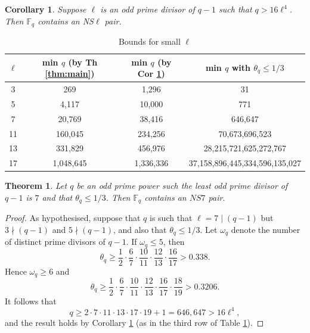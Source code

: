 \documentclass[10pt,a4paper]{amsart}
\newtheorem{thm}{Theorem}
\newtheorem{cor}{Corollary}
\newcommand{\F}{\mathbb{F}_q}
\begin{document}
\begin{cor}\label{Npos}
Suppose $\ell$ is an odd prime divisor of $q-1$ such that $q > 16 \ell^4$. Then $\F$ contains an  NS$\ell$ pair.
\end{cor}

\begin{table}[h]\label{smalltable}
\centering 
\caption{Bounds for small $\ell$}
\begin{tabular}{c|c|c|c}   
$\ell$ 
& min $q$ (by Th \ref{thm:main})
& min $q$ (by Cor \ref{Npos}) 
& min $q$ with $\theta_q \le 1/3$  \\[2pt]
 \hline
3  & 269          & 1,296        & 31 \\
5  & 4,117        & 10,000       & 771 \\
7  & 20,769       & 38,416       & 646,647 \\
11 & 160,045      & 234,256      & 70,673,696,523\\
13 & 331,829      & 456,976       & 28,215,721,625,272,767 \\
17 & 1,048,645    & 1,336,336     & 37,158,896,445,334,596,135,027\\
\end{tabular}
\end{table}

\begin{thm}\label{l7}
Let $q$ be an odd prime power such the least odd prime divisor of $q-1$ is $7$ and that $\theta_q \le 1/3$. Then $\F$  contains an  $NS7$ pair.
\end{thm}

\begin{proof}
As hypothesised, suppose  that $q$ is such that $\ell=7 \mid (q-1)$ but $3 \nmid (q-1)$ and $5 \nmid (q-1)$, and also that $\theta_q \le 1/3$.   Let $\omega_q$ denote the number of distinct prime divisors of $q-1$.
If $\omega_q \le 5$, then
\[
\theta_q \ge \frac{1}{2} \cdot \frac{6}{7} \cdot \frac{10}{11} \cdot \frac{12}{13} \cdot \frac{16}{17} > 0.338.
\]
Hence $\omega_q \ge 6$ and
\[
\theta_q \ge \frac{1}{2} \cdot \frac{6}{7} \cdot \frac{10}{11} \cdot \frac{12}{13} \cdot \frac{16}{17} \cdot \frac{18}{19} > 0.3206.
\]
It follows that
\[
q \ge 2 \cdot 7 \cdot 11 \cdot 13 \cdot 17 \cdot 19 + 1 = 646,647> 16\ell^4,
\]
and the result holds by Corollary  \ref{Npos} (as in the third row of Table \ref{smalltable}).
\end{proof}
\end{document}
